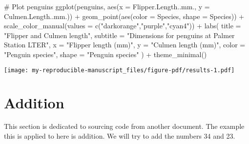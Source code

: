 \documentclass[
  letterpaper,
  DIV=11,
  numbers=noendperiod]{scrartcl}
\newenvironment{Shaded}{\begin{snugshade}}{\end{snugshade}}
\newcommand{\AttributeTok}[1]{\textcolor[rgb]{0.40,0.45,0.13}{#1}}
\newcommand{\CommentTok}[1]{\textcolor[rgb]{0.37,0.37,0.37}{#1}}
\newcommand{\FunctionTok}[1]{\textcolor[rgb]{0.28,0.35,0.67}{#1}}
\newcommand{\NormalTok}[1]{\textcolor[rgb]{0.00,0.23,0.31}{#1}}
\newcommand{\SpecialCharTok}[1]{\textcolor[rgb]{0.37,0.37,0.37}{#1}}
\newcommand{\StringTok}[1]{\textcolor[rgb]{0.13,0.47,0.30}{#1}}
\begin{document}
\begin{Shaded}
\begin{Highlighting}[]
\CommentTok{\# Plot penguins}
\FunctionTok{ggplot}\NormalTok{(penguins, }
       \FunctionTok{aes}\NormalTok{(}\AttributeTok{x =} \StringTok{\textasciigrave{}}\AttributeTok{Flipper.Length..mm.}\StringTok{\textasciigrave{}}\NormalTok{, }\AttributeTok{y =} \StringTok{\textasciigrave{}}\AttributeTok{Culmen.Length..mm.}\StringTok{\textasciigrave{}}\NormalTok{)) }\SpecialCharTok{+}
        \FunctionTok{geom\_point}\NormalTok{(}\FunctionTok{aes}\NormalTok{(}\AttributeTok{color =}\NormalTok{ Species, }\AttributeTok{shape =}\NormalTok{ Species)) }\SpecialCharTok{+}
        \FunctionTok{scale\_color\_manual}\NormalTok{(}\AttributeTok{values =} \FunctionTok{c}\NormalTok{(}\StringTok{"darkorange"}\NormalTok{,}\StringTok{"purple"}\NormalTok{,}\StringTok{"cyan4"}\NormalTok{)) }\SpecialCharTok{+}
        \FunctionTok{labs}\NormalTok{(}
                \AttributeTok{title =} \StringTok{"Flipper and Culmen length"}\NormalTok{,}
                \AttributeTok{subtitle =} \StringTok{"Dimensions for penguins at Palmer Station LTER"}\NormalTok{,}
                \AttributeTok{x =} \StringTok{"Flipper length (mm)"}\NormalTok{, }\AttributeTok{y =} \StringTok{"Culmen length (mm)"}\NormalTok{,}
                \AttributeTok{color =} \StringTok{"Penguin species"}\NormalTok{, }\AttributeTok{shape =} \StringTok{"Penguin species"}
\NormalTok{        ) }\SpecialCharTok{+}
        \FunctionTok{theme\_minimal}\NormalTok{()}
\end{Highlighting}
\end{Shaded}

\texttt{[image: my-reproducible-manuscript\_files/figure-pdf/results-1.pdf]}

\section{Addition}\label{addition}

This section is dedicated to sourcing code from another document. The
example this is applied to here is addition. We will try to add the
numbers 34 and 23.
\end{document}
